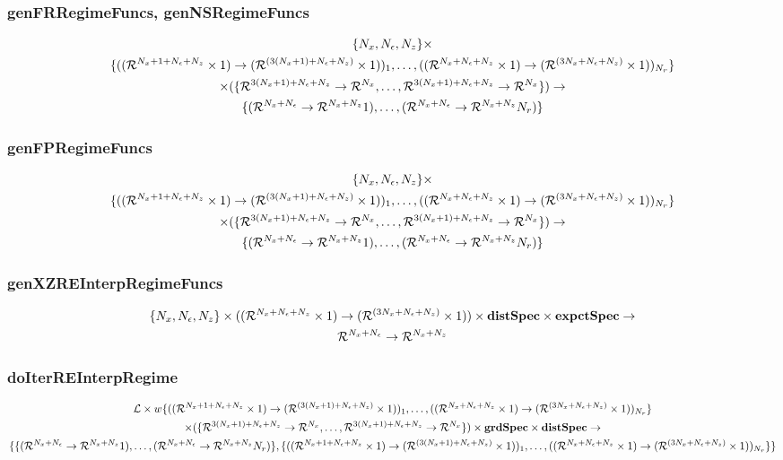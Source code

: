 \documentclass[tikz]{beamer}
\begin{document}
\begin{frame}
\frametitle{genFRRegimeFuncs, genNSRegimeFuncs}
\label{sec:genfrregimefunc}



{\small
\begin{gather*}
\{\numX,\numEps,\numZ\}\times\\
\{(\lilXRegimeFuncSig)_1,\ldots,(\xzFuncGuessSig)_{\numR}\}  \\
 \times (\eqnRegimeFuncSig )\rightarrow\\
\frfpnsRegimeFuncSig
\end{gather*}
}








\end{frame}
\begin{frame}
\frametitle{genFPRegimeFuncs}
\label{sec:genfpregimefunc}




{\small
\begin{gather*}
\{\numX,\numEps,\numZ\}\times\\
\{(\lilXRegimeFuncSig)_1,\ldots,(\xzFuncGuessSig)_{\numR}\}  \\
 \times (\eqnRegimeFuncSig )\rightarrow\\
\frfpnsRegimeFuncSig
\end{gather*}
}




\end{frame}
\begin{frame}
\frametitle{genXZREInterpRegimeFuncs}
\label{sec:genfpfunc}
\begin{gather*}
\{\numX,\numEps,\numZ\}\times(\xzFuncGuessSig)\times \dstSpec \times  \expctSpec   \rightarrow\\
\frfpnsFuncSig
\end{gather*}



\end{frame}
\begin{frame}
\frametitle{doIterREInterpRegime}
\label{sec:doiterreinterp}

\begin{gather*}
  \linMod \times 
w\{(\lilXRegimeFuncSig)_1,\ldots,(\xzFuncGuessSig)_{\numR}\}  \\
 \times (\eqnRegimeFuncSig ) \times \grdSpec \times \dstSpec \rightarrow\\
\{\frfpnsRegimeFuncSig, \{(\lilXRegimeFuncSig)_1,\ldots,(\xzFuncGuessSig)_{\numR}\}\}
\end{gather*}



\end{frame}
\end{document}

